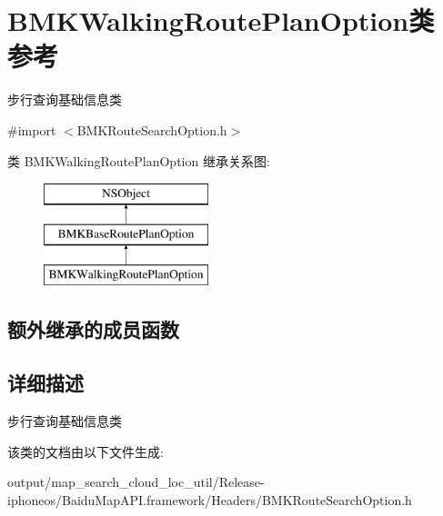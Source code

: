 \hypertarget{interface_b_m_k_walking_route_plan_option}{}\section{B\+M\+K\+Walking\+Route\+Plan\+Option类 参考}
\label{interface_b_m_k_walking_route_plan_option}


步行查询基础信息类  




{\ttfamily \#import $<$B\+M\+K\+Route\+Search\+Option.\+h$>$}

类 B\+M\+K\+Walking\+Route\+Plan\+Option 继承关系图\+:\begin{figure}[H]
\begin{center}
\leavevmode
\includegraphics[height=3.000000cm]{interface_b_m_k_walking_route_plan_option}
\end{center}
\end{figure}
\subsection*{额外继承的成员函数}


\subsection{详细描述}
步行查询基础信息类 

该类的文档由以下文件生成\+:\begin{DoxyCompactItemize}
\item 
output/map\+\_\+search\+\_\+cloud\+\_\+loc\+\_\+util/\+Release-\/iphoneos/\+Baidu\+Map\+A\+P\+I.\+framework/\+Headers/B\+M\+K\+Route\+Search\+Option.\+h\end{DoxyCompactItemize}
